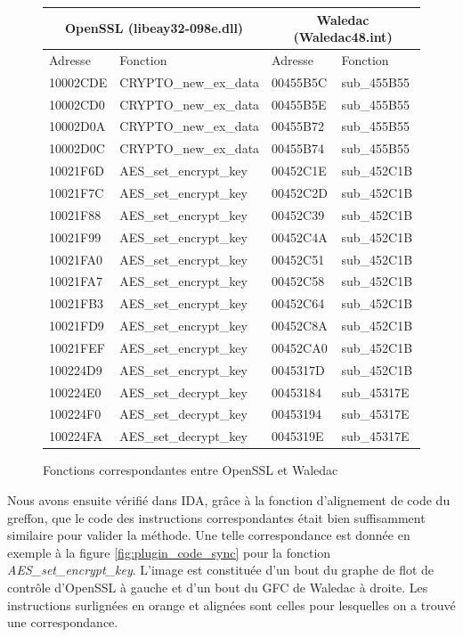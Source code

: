 \begin{figure}[h]
\begin{center}
\begin{tabular}{|l|l|l|l|}
\hline
\multicolumn{2}{|c|}{OpenSSL (libeay32-098e.dll)} & \multicolumn{2}{c|}{Waledac (Waledac48.int)} \\
\hline
Adresse & Fonction & Adresse & Fonction \\
\hline
 10002CDE & CRYPTO\_new\_ex\_data & 00455B5C & sub\_455B55 \\
 10002CD0 & CRYPTO\_new\_ex\_data & 00455B5E & sub\_455B55 \\
 10002D0A & CRYPTO\_new\_ex\_data & 00455B72 & sub\_455B55 \\
 10002D0C & CRYPTO\_new\_ex\_data & 00455B74 & sub\_455B55 \\
\hline
 10021F6D & AES\_set\_encrypt\_key & 00452C1E & sub\_452C1B \\
 10021F7C & AES\_set\_encrypt\_key & 00452C2D & sub\_452C1B \\
 10021F88 & AES\_set\_encrypt\_key & 00452C39 & sub\_452C1B \\
 10021F99 & AES\_set\_encrypt\_key & 00452C4A & sub\_452C1B \\
 10021FA0 & AES\_set\_encrypt\_key & 00452C51 & sub\_452C1B \\
 10021FA7 & AES\_set\_encrypt\_key & 00452C58 & sub\_452C1B \\
 10021FB3 & AES\_set\_encrypt\_key & 00452C64 & sub\_452C1B \\
 10021FD9 & AES\_set\_encrypt\_key & 00452C8A & sub\_452C1B \\
 10021FEF & AES\_set\_encrypt\_key & 00452CA0 & sub\_452C1B \\
 100224D9 & AES\_set\_encrypt\_key & 0045317D & sub\_452C1B \\
\hline
 100224E0 & AES\_set\_decrypt\_key & 00453184 & sub\_45317E \\
 100224F0 & AES\_set\_decrypt\_key & 00453194 & sub\_45317E \\
 100224FA & AES\_set\_decrypt\_key & 0045319E & sub\_45317E \\
\hline
\end{tabular}
\end{center}
\caption{Fonctions correspondantes entre OpenSSL et Waledac}
\label{fig:plugin_subroutines}
\end{figure}


Nous avons ensuite vérifié dans IDA, grâce à la fonction d'alignement de code du greffon, que le code des instructions correspondantes était bien suffisamment similaire pour valider la méthode.
Une telle correspondance est donnée en exemple à la figure \ref{fig:plugin_code_sync} pour la fonction \emph{AES\_set\_encrypt\_key}.
L'image est constituée d'un bout du graphe de flot de contrôle d'OpenSSL à gauche et d'un bout du GFC de Waledac à droite.
Les instructions surlignées en orange et alignées sont celles pour lesquelles on a trouvé une correspondance.


